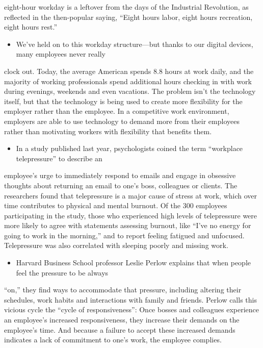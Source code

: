 \documentclass[UTF8,11pt]{ctexart}
\begin{document}
eight-hour workday is a leftover from the days of the Industrial Revolution, as reflected in the then-popular saying, “Eight hours labor, eight hours recreation, eight hours rest.”


\begin{itemize}[leftmargin=2em,itemsep=.2em,topsep=.4em]\item[H.] We’ve held on to this workday structure—but thanks to our digital devices, many employees never really
\end{itemize}

clock out. Today, the average American spends 8.8 hours at work daily, and the majority of working professionals spend additional hours checking in with work during evenings, weekends and even vacations. The problem isn’t the technology itself, but that the technology is being used to create more flexibility for the employer rather than the employee. In a competitive work environment, employers are able to use technology to demand more from their employees rather than motivating workers with flexibility that benefits them.


\begin{itemize}[leftmargin=2em,itemsep=.2em,topsep=.4em]\item[I.] In a study published last year, psychologists coined the term “workplace telepressure” to describe an
\end{itemize}

employee’s urge to immediately respond to emails and engage in obsessive thoughts about returning an email to one’s boss, colleagues or clients. The researchers found that telepressure is a major cause of stress at work, which over time contributes to physical and mental burnout. Of the 300 employees participating in the study, those who experienced high levels of telepressure were more likely to agree with statements assessing burnout, like “I’ve no energy for going to work in the morning,” and to report feeling fatigued and unfocused. Telepressure was also correlated with sleeping poorly and missing work.


\begin{itemize}[leftmargin=2em,itemsep=.2em,topsep=.4em]\item[J.] Harvard Business School professor Leslie Perlow explains that when people feel the pressure to be always
\end{itemize}

“on,” they find ways to accommodate that pressure, including altering their schedules, work habits and interactions with family and friends. Perlow calls this vicious cycle the “cycle of responsiveness”: Once bosses and colleagues experience an employee’s increased responsiveness, they increase their demands on the employee’s time. And because a failure to accept these increased demands indicates a lack of commitment to one’s work, the employee complies.
\end{document}
